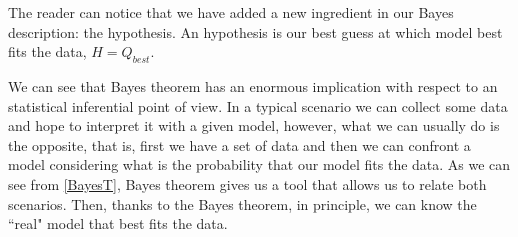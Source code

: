 \documentclass[onecolumn,           %
               showpacs,            %
               preprintnumbers,     %
               aps,                 %
               letterpaper,             %
               superscriptaddress,      %
               nofootinbib,         %
               tightenlines,        %
               floats,floatfix      %
               ,usenatbib,
               ]{revtex4-1}
\begin{document}
The reader can notice that we have added a new ingredient in our Bayes description: the hypothesis. An hypothesis is our best guess at which model best fits the data, $H=Q_{best}$.

We can see that Bayes theorem has an enormous implication with respect to an statistical inferential point of view. In a typical scenario we can collect some data and hope to interpret it with a given model, however, what we can usually do is the opposite, that is, first we have a set of data and then we can confront a model considering what is the probability that our model fits the data. As we can see from \eqref{BayesT}, Bayes theorem gives us a tool that allows us to relate both scenarios. Then, thanks to the Bayes theorem, in principle, we can know the ``real" model that best fits the data. 
\end{document}
